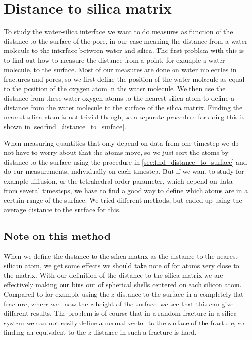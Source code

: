 \section{Distance to silica matrix\label{sec:measuring_distance_to_matrix}}
To study the water-silica interface we want to do measures as function of the distance to the surface of the pore, in our case meaning the distance from a water molecule to the interface between water and silica. The first problem with this is to find out how to measure the distance from a point, for example a water molecule, to the surface. Most of our measures are done on water molecules in fractures and pores, so we first define the position of the water molecule as equal to the position of the oxygen atom in the water molecule. We then use the distance from these water-oxygen atoms to the nearest silica atom to define a distance from the water molecule to the surface of the silica matrix. Finding the nearest silica atom is not trivial though, so a separate procedure for doing this is shown in \cref{sec:find_distance_to_surface}.

When measuring quantities that only depend on data from one timestep we do not have to worry about that the atoms move, so we just sort the atoms by distance to the surface using the procedure in \cref{sec:find_distance_to_surface} and do our measurements, individually on each timestep. But if we want to study for example diffusion, or the tetrahedral order parameter, which depend on data from several timesteps, we have to find a good way to define which atoms are in a certain range of the surface. We tried different methods, but ended up using the average distance to the surface for this.

\subsection{Note on this method\label{sec:distance_to_matrix_issues}}
%
When we define the distance to the silica matrix as the distance to the nearest silicon atom, we get some effects we should take note of for atoms very close to the matrix. With our definition of the distance to the silica matrix we are effectively making our bins out of spherical shells centered on each silicon atom. Compared to for example using the $z$-distance to the surface in a completely flat fracture, where we know the $z$-height of the surface, we see that this can give different results. The problem is of course that in a random fracture in a silica system we can not easily define a normal vector to the surface of the fracture, so finding an equivalent to the $z$-distance in such a fracture is hard.

